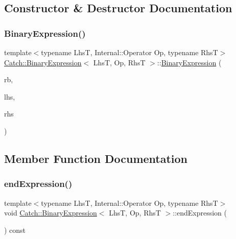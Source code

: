 \subsection{Constructor \& Destructor Documentation}
\mbox{\label{class_catch_1_1_binary_expression_a0d81384761aba5f7a6d5f4fc7e7944f3}} 
\subsubsection{\texorpdfstring{Binary\+Expression()}{BinaryExpression()}}
{\footnotesize\ttfamily template$<$typename LhsT, Internal\+::\+Operator Op, typename RhsT$>$ \\
\mbox{\hyperlink{class_catch_1_1_binary_expression}{Catch\+::\+Binary\+Expression}}$<$ LhsT, Op, RhsT $>$\+::\mbox{\hyperlink{class_catch_1_1_binary_expression}{Binary\+Expression}} (\begin{DoxyParamCaption}\item[{\mbox{\hyperlink{class_catch_1_1_result_builder}{Result\+Builder}} \&}]{rb,  }\item[{LhsT}]{lhs,  }\item[{RhsT}]{rhs }\end{DoxyParamCaption})\hspace{0.3cm}{\ttfamily [inline]}}



\subsection{Member Function Documentation}
\mbox{\label{class_catch_1_1_binary_expression_aa1dba7f316f70902859b8eab27692dfb}} 
\subsubsection{\texorpdfstring{end\+Expression()}{endExpression()}}
{\footnotesize\ttfamily template$<$typename LhsT, Internal\+::\+Operator Op, typename RhsT$>$ \\
void \mbox{\hyperlink{class_catch_1_1_binary_expression}{Catch\+::\+Binary\+Expression}}$<$ LhsT, Op, RhsT $>$\+::end\+Expression (\begin{DoxyParamCaption}{ }\end{DoxyParamCaption}) const\hspace{0.3cm}{\ttfamily [inline]}}

